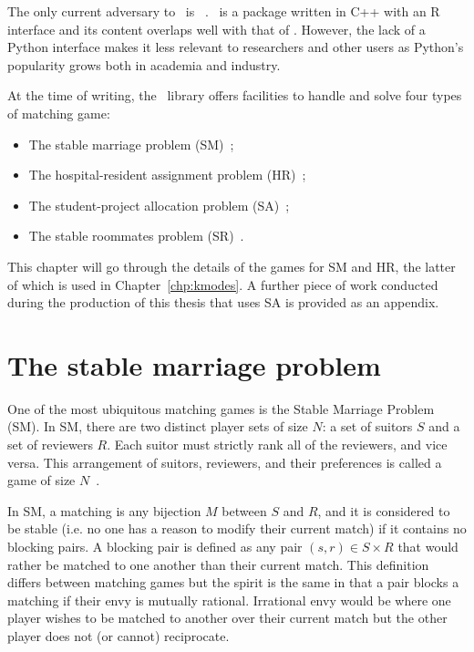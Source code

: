 The only current adversary to \matching\ is \matchingr~\cite{Tilly2018}.
\matchingr\ is a package written in C++ with an R interface and its content
overlaps well with that of \matching. However, the lack of a Python interface
makes it less relevant to researchers and other users as Python's popularity
grows both in academia and industry.

At the time of writing, the \matching\ library offers facilities to handle and
solve four types of matching game:

\begin{itemize}
    \item The stable marriage problem (SM)~\cite{Gale1962};
    \item The hospital-resident assignment problem
        (HR)~\cite{Gale1962,Roth1984};
    \item The student-project allocation problem (SA)~\cite{Abraham2007};
    \item The stable roommates problem (SR)~\cite{Irving1985}.
\end{itemize}

This chapter will go through the details of the games for SM and HR, the latter
of which is used in Chapter~\ref{chp:kmodes}. A further piece of work conducted
during the production of this thesis that uses SA is provided as an appendix.


\section{The stable marriage problem}

One of the most ubiquitous matching games is the Stable Marriage Problem
(SM). In SM, there are two distinct player sets of size \(N\): a set of suitors
\(S\) and a set of reviewers \(R\). Each suitor must strictly rank all of the
reviewers, and vice versa. This arrangement of suitors, reviewers, and
their preferences is called a game of size \(N\)~\cite{Gale1962}.

In SM, a matching is any bijection \(M\) between \(S\) and \(R\), and it is
considered to be stable (i.e. no one has a reason to modify their current match)
if it contains no blocking pairs. A blocking pair is defined as any pair \((s,
r) \in S \times R\) that would rather be matched to one another than their
current match. This definition differs between matching games but the spirit is
the same in that a pair blocks a matching if their envy is mutually rational.
Irrational envy would be where one player wishes to be matched to another over
their current match but the other player does not (or cannot) reciprocate.

